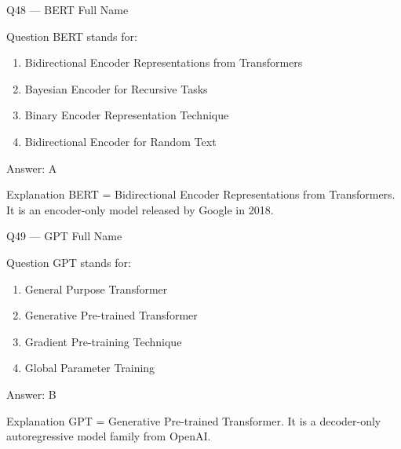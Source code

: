 \documentclass[aspectratio=169,8pt]{beamer}
\begin{document}
	\begin{frame}{Q48 --- BERT Full Name}
		\begin{block}{Question}
			BERT stands for:
			\begin{enumerate}
				\item Bidirectional Encoder Representations from Transformers
				\item Bayesian Encoder for Recursive Tasks
				\item Binary Encoder Representation Technique
				\item Bidirectional Encoder for Random Text
			\end{enumerate}
		\end{block}
		\begin{exampleblock}{Answer: A}\end{exampleblock}
		\begin{block}{Explanation}
			BERT = Bidirectional Encoder Representations from Transformers. It is an encoder-only model released by Google in 2018.
		\end{block}
	\end{frame}
	
	\begin{frame}{Q49 --- GPT Full Name}
		\begin{block}{Question}
			GPT stands for:
			\begin{enumerate}
				\item General Purpose Transformer
				\item Generative Pre-trained Transformer
				\item Gradient Pre-training Technique
				\item Global Parameter Training
			\end{enumerate}
		\end{block}
		\begin{exampleblock}{Answer: B}\end{exampleblock}
		\begin{block}{Explanation}
			GPT = Generative Pre-trained Transformer. It is a decoder-only autoregressive model family from OpenAI.
		\end{block}
	\end{frame}
	
\end{document}
